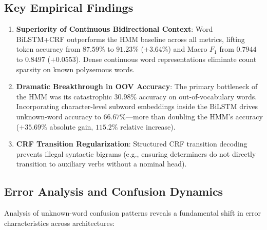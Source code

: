 \documentclass[conference]{IEEEtran}
\begin{document}
\subsection{Key Empirical Findings}
\begin{enumerate}
    \item \textbf{Superiority of Continuous Bidirectional Context}: Word BiLSTM+CRF outperforms the HMM baseline across all metrics, lifting token accuracy from $87.59\%$ to $91.23\%$ ($+3.64\%$) and Macro $F_1$ from $0.7944$ to $0.8497$ ($+0.0553$). Dense continuous word representations eliminate count sparsity on known polysemous words.
    \item \textbf{Dramatic Breakthrough in OOV Accuracy}: The primary bottleneck of the HMM was its catastrophic $30.98\%$ accuracy on out-of-vocabulary words. Incorporating character-level subword embeddings inside the BiLSTM drives unknown-word accuracy to $\mathbf{66.67\%}$—more than doubling the HMM's accuracy ($+35.69\%$ absolute gain, $115.2\%$ relative increase).
    \item \textbf{CRF Transition Regularization}: Structured CRF transition decoding prevents illegal syntactic bigrams (e.g., ensuring determiners do not directly transition to auxiliary verbs without a nominal head).
\end{enumerate}

\subsection{Error Analysis and Confusion Dynamics}
Analysis of unknown-word confusion patterns reveals a fundamental shift in error characteristics across architectures:
\end{document}
